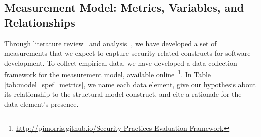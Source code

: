 \subsection{Measurement Model: Metrics, Variables, and Relationships}
\label{sec:model_measurement}
Through literature review~\cite{morrison2014mapping} and analysis~\cite{morrison2017surveying,morrison2017measuring}, we have developed a set of measurements that we expect to capture security-related constructs for software development. To collect empirical data, we have developed a data collection framework for the measurement model, available online~\footnote{\url{http://pjmorris.github.io/Security-Practices-Evaluation-Framework}}. In Table \ref{tab:model_spef_metrics}, we name each data element, give our hypothesis about its relationship to the structural model construct, and cite a rationale for the data element's presence. 
		
